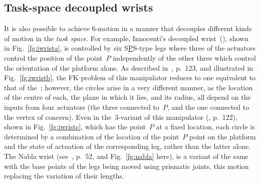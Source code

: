 \documentclass[DD]{iitmdiss}
\newcommand{\mref}[1]{\ref{#1}}
\newcommand{\mcite}[1]{\cite{#1}}
\newcommand{\mlabel}[1]{\label{#1}}
\begin{document}
\subsection{Task-space decoupled wrists}\mlabel{sc:wrists}
%
It is also possible to achieve 6-\dofs motion in a manner that decouples different kinds of motion in the \emph{task space}. For example, Innocenti's decoupled wrist~(\mcite{merletbook}), shown in Fig.~\mref{fg:iwrista}, is controlled by six S\underline{P}S-type legs where three of the actuators control the position of the point~$P$ independently of the other three which control the orientation of the platform alone. As described in~\mcite{merletbook}, p.~123, and illustrated in Fig.~\mref{fg:iwristb}, the FK problem of this manipulator reduces to one equivalent to that of the~\rps; however, the circles arise in a very different manner, as the location of the centre of each, the plane in which it lies, and its radius, all depend on the inputs from four actuators (the three connected to~$P$, and the one connected to the vertex of concern). Even in the~3-\dofs variant of this manipulator (\mcite{merletbook}, p.~122), shown in Fig.~\mref{fg:iwristc}, which has the point~$P$ at a fixed location, each circle is determined by a combination of the location of the point~$P$ point on the platform and the state of actuation of the corresponding leg, rather than the latter alone. The Nabla wrist (see~\mcite{merletbook}, p.~52, and Fig.~\mref{fg:nabla} here), is a variant of the same with the base points of the legs being moved using prismatic joints, this motion replacing the variation of their lengths.
\end{document}
